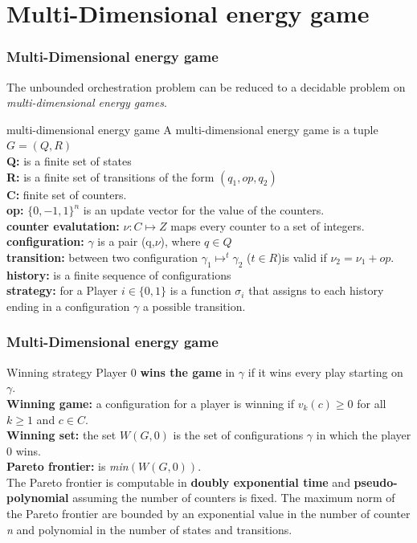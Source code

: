 \documentclass{beamer}
\begin{document}
\section{Multi-Dimensional energy game}
\begin{frame}
\frametitle{Multi-Dimensional energy game}
The unbounded orchestration problem can be reduced to a decidable problem on \textit{multi-dimensional energy games}.
\begin{block}{multi-dimensional energy game}
A multi-dimensional energy game is a tuple $G=(Q,R)$\\
\textbf{Q:} is a finite set of states\\
\textbf{R:} is a finite set of transitions of the form $(q_{1},op,q_{2})$\\
\textbf{C:} finite set of counters.\\
\textbf{op:} $\{0,-1,1\}^{n}$ is an update vector for the value of the counters.\\
\textbf{counter evalutation:} $\nu : C \mapsto Z$ maps every counter to a set of integers.
\textbf{configuration:} $\gamma$ is a pair (q,$\nu$), where $q\in Q$ \\
\textbf{transition:}  between two configuration $\gamma_{1} \mapsto^{t} \gamma_{2}$ ($t\in R$)is valid if $\nu_{2}= \nu_{1}+op$.\\
\textbf{history: } is a finite sequence of configurations\\
\textbf{strategy:} for a Player $i\in\{0,1\}$ is a function $\sigma_{i}$
that assigns to each history ending in a configuration $\gamma$ a possible transition.
\end{block}

\end{frame}

\begin{frame}
\frametitle{Multi-Dimensional energy game}
\begin{block}{Winning strategy}
Player 0 \textbf{wins the game} in $\gamma$ if it wins every play starting on $\gamma$.\\
\textbf{Winning game:} a configuration for a player  is winning if $v_{k}(c) \ge 0$ for all $k \ge 1 $ and $c \in C$.\\
\textbf{Winning set:} the set $W(G,0)$ is the set of configurations $\gamma$ in which the player 0 wins. \\
\textbf{Pareto frontier:} is \textit{min}$(W(G,0))$.\\
The Pareto frontier is computable in \textbf{doubly exponential time} and 
\textbf{pseudo-polynomial} assuming the number of counters is fixed. The maximum norm of the Pareto frontier are bounded by an exponential value in the number of counter \textit{n} and polynomial in the number of states and transitions. 

\end{block}

\end{frame}
\end{document}
